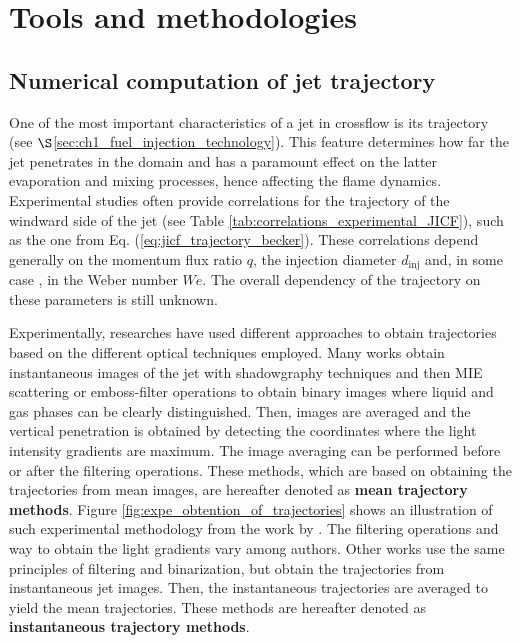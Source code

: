 \section{Tools and methodologies}


\subsection{Numerical computation of jet trajectory}
	\label{sec:ch5_tools_jicf_trajectories}

One of the most important characteristics of a jet in crossflow is its trajectory (see $\S$\ref{sec:ch1_fuel_injection_technology}). This feature determines how far the jet penetrates in the domain and has a paramount effect on the latter evaporation and mixing processes, hence affecting the flame dynamics. Experimental studies often provide correlations for the trajectory of the windward side of the jet (see Table \ref{tab:correlations_experimental_JICF}), such as the one from Eq. (\ref{eq:jicf_trajectory_becker}). These correlations depend generally on the momentum flux ratio $q$, the injection diameter $d_\mathrm{inj}$ and, in some case , in the Weber number $We$. The overall dependency of the trajectory on these parameters is still unknown.

Experimentally, researches have used different approaches to obtain trajectories based on the different optical techniques employed. Many works  obtain instantaneous images of the jet with shadowgraphy techniques and then MIE scattering or emboss-filter operations to obtain binary images where liquid and gas phases can be clearly distinguished. Then, images are averaged and the vertical penetration is obtained by detecting the coordinates where the light intensity gradients are maximum. The image averaging can be performed before or after the filtering operations. These methods, which are based on obtaining the trajectories from mean images, are hereafter denoted as \textbf{mean trajectory methods}. Figure \ref{fig:expe_obtention_of_trajectories} shows an illustration of such experimental methodology from the work by . The filtering operations and way to obtain the light gradients vary among authors. Other works  use the same principles of filtering and binarization, but obtain the trajectories from instantaneous jet images. Then, the instantaneous trajectories are averaged to yield the mean trajectories. These methods are hereafter denoted as \textbf{instantaneous trajectory methods}.

